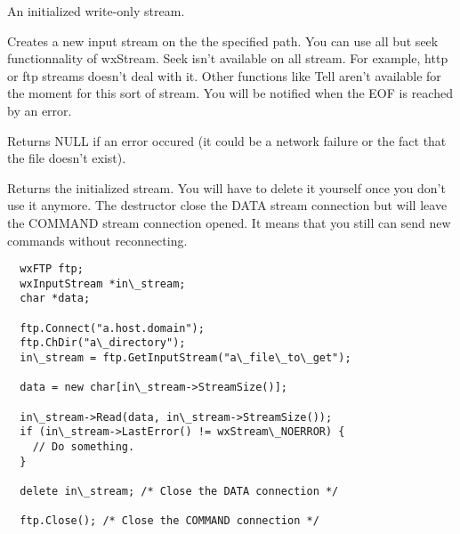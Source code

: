 An initialized write-only stream.




\label{wxftpgetinput}


Creates a new input stream on the the specified path. You can use all but seek
functionnality of wxStream. Seek isn't available on all stream. For example,
http or ftp streams doesn't deal with it. Other functions like Tell
aren't available for the moment for this sort of stream.
You will be notified when the EOF is reached by an error.


Returns NULL if an error occured (it could be a network failure or the fact
that the file doesn't exist).

Returns the initialized stream. You will have to delete it yourself once you
don't use it anymore. The destructor close the DATA stream connection but
will leave the COMMAND stream connection opened. It means that you still
can send new commands without reconnecting.


\begin{verbatim}
  wxFTP ftp;
  wxInputStream *in\_stream;
  char *data;

  ftp.Connect("a.host.domain");
  ftp.ChDir("a\_directory");
  in\_stream = ftp.GetInputStream("a\_file\_to\_get");

  data = new char[in\_stream->StreamSize()];

  in\_stream->Read(data, in\_stream->StreamSize());
  if (in\_stream->LastError() != wxStream\_NOERROR) {
    // Do something.
  }

  delete in\_stream; /* Close the DATA connection */

  ftp.Close(); /* Close the COMMAND connection */
\end{verbatim}



